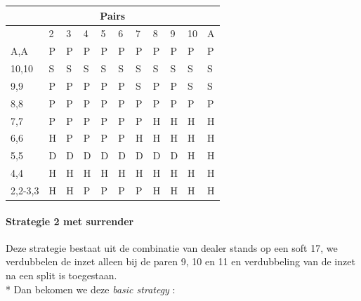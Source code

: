 \documentclass[conference]{IEEEtran}
\begin{document}
\begin{table}[ht]
\begin{tabular}{|l|l|l|l|l|l|l|l|l|l|l|}
\multicolumn{11}{|c|}{\textbf{Pairs}}                                 \\ \hline
                             & 2 & 3 & 4 & 5 & 6 & 7 & 8 & 9 & 10 & A \\ \hline
A,A                          & P & P & P & P & P & P & P & P & P & P  \\ \hline
10,10                        & S & S & S & S & S & S & S & S & S & S  \\ \hline
9,9                          & P & P & P & P & P & S & P & P & S & S  \\ \hline
8,8                          & P & P & P & P & P & P & P & P & P & P  \\ \hline
7,7                          & P & P & P & P & P & P & H & H & H & H  \\ \hline
6,6                          & H & P & P & P & P & H & H & H & H & H  \\ \hline
5,5                          & D & D & D & D & D & D & D & D & H & H  \\ \hline
4,4                          & H & H & H & H & H & H & H & H & H & H  \\ \hline
2,2-3,3                      & H & H & P & P & P & P & H & H & H & H  \\ \hline
\end{tabular}
\end{table}


\paragraph{Strategie 2 met surrender}

Deze strategie bestaat uit de combinatie van dealer stands op een soft 17, we verdubbelen de inzet alleen bij de paren 9, 10 en 11 en verdubbeling van de inzet na een split is toegestaan.\\*
Dan bekomen we deze \textit{basic strategy} :
\end{document}
